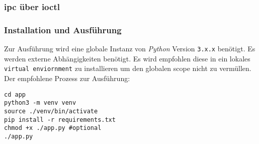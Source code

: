 \subsubsection{\acrshort{ipc} über \acrshort{ioctl}}

\subsubsection{Installation und Ausführung}

Zur Ausführung wird eine globale Instanz von \textit{Python} Version \texttt{3.x.x} benötigt.
Es werden externe Abhängigkeiten benötigt.
Es wird empfohlen diese in ein lokales \texttt{virtual enviornment} zu installieren um den globalen scope nicht zu vermüllen.
Der empfohlene Prozess zur Ausführung:
\begin{lstlisting}
cd app
python3 -m venv venv
source ./venv/bin/activate
pip install -r requirements.txt
chmod +x ./app.py #optional
./app.py
\end{lstlisting}
